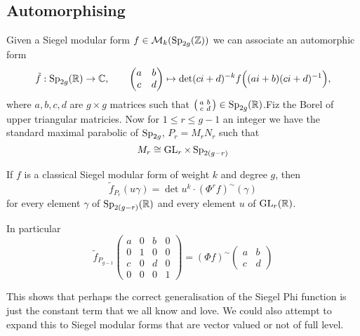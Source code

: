 \subsection{Automorphising}
Given a Siegel modular form \(f\in \mathcal{M}_k(\Sp_{2g}(\Z))\) we can associate an automorphic form
\[\tilde{f} : \Sp_{2g}(\R)\to\C, \qquad \begin{pmatrix} a & b\\ c & d\end{pmatrix}\mapsto \det(ci+d)^{-k} f\Bigl((ai+b)(ci+d)\inv\Bigr), \]
where \(a,b,c,d\) are \(g\times g\) matrices such that \(\bigl(\begin{smallmatrix} a & b\\ c & d\end{smallmatrix}\bigr)\in\Sp_{2g}(\R)\).Fiz the Borel of upper triangular matricies. Now for \(1\leq r\leq g-1\) an integer we have the standard maximal parabolic of \(\operatorname{Sp}_{2g}\), \(P_r = M_rN_r\) such that 
\[M_r \cong \operatorname{GL}_r\times \operatorname{Sp}_{2(g-r)}\]

\begin{Theorem}[Zhang]
	If \(f\) is a classical Siegel modular form of weight \(k\) and degree \(g\), then
	\begin{equation} 
		\tilde f_{P_r}(u\gamma) = \det u^k\cdot (\Phi^{r} f)^\sim(\gamma)
	\end{equation}
	for every element \(\gamma\) of \(\Sp_{2(g-r)}(\R)\) and every element \(u\) of \(\GL_{r}(\R)\).

 In particular 
 \[\tilde{f}_{P_{g-1}}\begin{pmatrix} a & 0 & b & 0\\ 0 & 1 & 0 & 0\\ c & 0 & d & 0\\ 0 & 0 & 0 & 1\end{pmatrix} = (\Phi f)^\sim\begin{pmatrix}
     a & b\\
     c& d
 \end{pmatrix}\]
\end{Theorem}

This shows that perhaps the correct generalisation of the Siegel Phi function is just the constant term that we all know and love. We could also attempt to expand this to Siegel modular forms that are vector valued or not of full level. 

